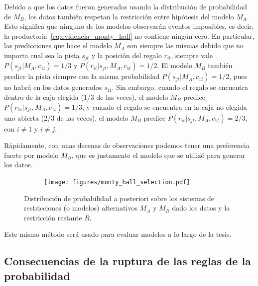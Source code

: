 \documentclass[a4paper,11pt]{book}
\theoremstyle{definition}
\begin{document}

Debido a que los datos fueron generados usando la distribuci\'on de probabilidad de $M_B$, los datos tambi\'en respetan la restricci\'on entre hip\'otesis del modelo $M_A$.
%
Esto significa que ninguno de los modelos observar\'an eventos imposibles, es decir, la productoria~\eqref{eq:evidencia_monty_hall} no contiene ning\'un cero.
%
En particular, las predicciones que hace el modelo $M_A$ son siempre las mismas debido que no importa cual sea la pista $s_{jt}$ y la posici\'on del regalo $r_{it}$, siempre vale $P(s_{jt}|M_A,c_{1t}) = 1/3$ y $P(r_{it}|s_{jt},M_A,c_{1t}) = 1/2$.
%
El modelo $M_B$ tambi\'en predice la pista siempre con la misma probabilidad $P(s_{jt}|M_A,c_{1t})=1/2$, pues no habr\'a en los datos generados $s_{1t}$.
%
Sin embargo, cuando el regalo se encuentra dentro de la caja elegida (1/3 de las veces), el modelo $M_B$ predice $P(r_{1t}|s_{jt},M_A,c_{1t}) = 1/3$, y cuando el regalo se encuentra en la caja no elegida uno abierta (2/3 de las veces), el modelo $M_B$ predice $P(r_{it}|s_{jt},M_A,c_{1t}) = 2/3$, con $i\neq1$ y $i\neq j$.


R\'apidamente, con unas decenas de observaciones podemos tener una preferencia fuerte por modelo $M_B$, que es justamente el modelo que se utiliz\'o para generar los datos.
%
\begin{figure}[H]
    \centering
    \begin{subfigure}[b]{0.45\textwidth}
    \texttt{[image: figures/monty\_hall\_selection.pdf]}
    \end{subfigure}
    \caption{
    Distribuci\'on de probabilidad a posteriori sobre los sistemas de restricciones (o modelos) alternativos $M_A$ y $M_B$ dado los datos y la restricci\'on restante $R$.
    }
    \label{fig:monty_hall_selection}
\end{figure}
%
Este mismo m\'etodo ser\'a usado para evaluar modelos a lo largo de la tesis.

\subsection{Consecuencias de la ruptura de las reglas de la probabilidad}
\end{document}
